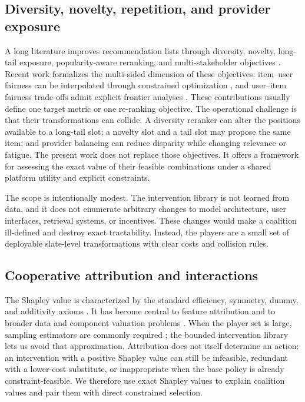 \documentclass[review]{elsarticle}
\theoremstyle{plain}
\theoremstyle{definition}
\theoremstyle{remark}
\begin{document}
\subsection{Diversity, novelty, repetition, and provider exposure}

A long literature improves recommendation lists through diversity, novelty, long-tail exposure, popularity-aware reranking, and multi-stakeholder objectives \cite{ziegler2005improving,vargas2011rank,castells2015novelty,abdollahpouri2019popularity,burke2018multistakeholder,ekstrand2022fairness}. Recent work formalizes the multi-sided dimension of these objectives: item--user fairness can be interpolated through constrained optimization \cite{chen2024interpolating}, and user--item fairness trade-offs admit explicit frontier analyses \cite{greenwood2024fairness}. These contributions usually define one target metric or one re-ranking objective. The operational challenge is that their transformations can collide. A diversity reranker can alter the positions available to a long-tail slot; a novelty slot and a tail slot may propose the same item; and provider balancing can reduce disparity while changing relevance or fatigue. The present work does not replace those objectives. It offers a framework for assessing the exact value of their feasible combinations under a shared platform utility and explicit constraints.

The scope is intentionally modest. The intervention library is not learned from data, and it does not enumerate arbitrary changes to model architecture, user interfaces, retrieval systems, or incentives. These changes would make a coalition ill-defined and destroy exact tractability. Instead, the players are a small set of deployable slate-level transformations with clear costs and collision rules.

\subsection{Cooperative attribution and interactions}

The Shapley value is characterized by the standard efficiency, symmetry, dummy, and additivity axioms \cite{shapley1953}. It has become central to feature attribution \cite{lundberg2017shap,sundararajan2017axiomatic,covert2021understanding} and to broader data and component valuation problems \cite{rozemberczki2022shapley}. When the player set is large, sampling estimators are commonly required \cite{castro2009polynomial}; the bounded intervention library lets us avoid that approximation. Attribution does not itself determine an action: an intervention with a positive Shapley value can still be infeasible, redundant with a lower-cost substitute, or inappropriate when the base policy is already constraint-feasible. We therefore use exact Shapley values to explain coalition values and pair them with direct constrained selection.
\end{document}
